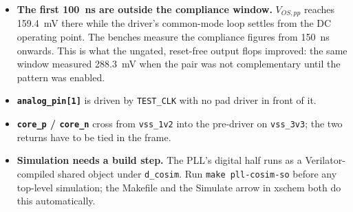 \documentclass[a4paper,10pt]{article}
\newcommand{\net}[1]{\texttt{#1}}
\begin{document}
\begin{itemize}[leftmargin=*]
        \SIrange{36}{38}{\micro\metre} giving \SI{102}{\milli\volt}, and a
        common-mode RC damper across the outputs gives \SI{97}{\milli\volt} for
        \SI{2.6}{\percent} of $|V_{OD}|$.
  \item \textbf{The first \SI{100}{\nano\second} are outside the compliance
        window.} $V_{OS,pp}$ reaches \SI{159.4}{\milli\volt} there while the
        driver's common-mode loop settles from the DC operating point. The
        benches measure the compliance figures from \SI{150}{\nano\second}
        onwards. This is what the ungated, reset-free output flops improved:
        the same window measured \SI{288.3}{\milli\volt} when the pair was not
        complementary until the pattern was enabled.
  \item \textbf{\net{analog\_pin[1]}} is driven by \net{TEST\_CLK} with no pad
        driver in front of it.
  \item \textbf{\net{core\_p} / \net{core\_n}} cross from \net{vss\_1v2} into the
        pre-driver on \net{vss\_3v3}; the two returns have to be tied in the
        frame.
  \item \textbf{Simulation needs a build step.} The PLL's digital half runs as a
        Verilator-compiled shared object under \texttt{d\_cosim}. Run
        \texttt{make pll-cosim-so} before any top-level simulation; the Makefile
        and the Simulate arrow in xschem both do this automatically.
\end{itemize}
\end{document}
